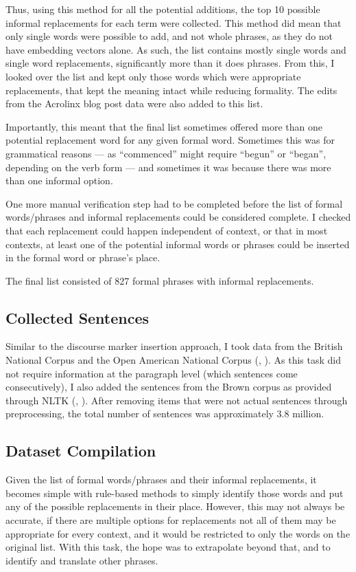 Thus, using this method for all the potential additions, the top 10 possible informal replacements for each term were collected. This method did mean that only single words were possible to add, and not whole phrases, as they do not have embedding vectors alone. As such, the list contains mostly single words and single word replacements, significantly more than it does phrases. From this, I looked over the list and kept only those words which were appropriate replacements, that kept the meaning intact while reducing formality. The edits from the Acrolinx blog post data were also added to this list.

Importantly, this meant that the final list sometimes offered more than one potential replacement word for any given formal word. Sometimes this was for grammatical reasons --- as ``commenced'' might require ``begun'' or ``began'', depending on the verb form --- and sometimes it was because there was more than one informal option.

One more manual verification step had to be completed before the list of formal words/phrases and informal replacements could be considered complete. I checked that each replacement could happen independent of context, or that in most contexts, at least one of the potential informal words or phrases could be inserted in the formal word or phrase's place.

The final list consisted of 827 formal phrases with informal replacements.

\subsection{Collected Sentences}

Similar to the discourse marker insertion approach, I took data from the British National Corpus and the Open American National Corpus (\cite{bnc}, \cite{ide2001oanc}). As this task did not require information at the paragraph level (which sentences come consecutively), I also added the sentences from the Brown corpus as provided through NLTK (\cite{bird2009nltk}, \cite{francis1979brown}). After removing items that were not actual sentences through preprocessing, the total number of sentences was approximately 3.8 million.

\subsection{Dataset Compilation}

Given the list of formal words/phrases and their informal replacements, it becomes simple with rule-based methods to simply identify those words and put any of the possible replacements in their place. However, this may not always be accurate, if there are multiple options for replacements not all of them may be appropriate for every context, and it would be restricted to only the words on the original list. With this task, the hope was to extrapolate beyond that, and to identify and translate other phrases.

